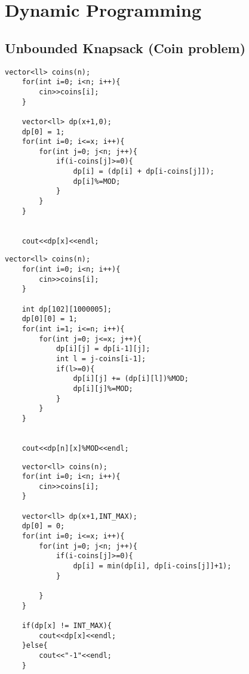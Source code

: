 \documentclass{article}
\begin{document}
\section{Dynamic Programming}
\subsection{Unbounded Knapsack (Coin problem)}
\begin{lstlisting}
vector<ll> coins(n);
    for(int i=0; i<n; i++){
        cin>>coins[i];
    }
    
    vector<ll> dp(x+1,0);
    dp[0] = 1;
    for(int i=0; i<=x; i++){
        for(int j=0; j<n; j++){
            if(i-coins[j]>=0){
                dp[i] = (dp[i] + dp[i-coins[j]]);
                dp[i]%=MOD;
            }
        }
    }
        
        
    cout<<dp[x]<<endl;
\end{lstlisting}
 
\begin{lstlisting}
vector<ll> coins(n);
    for(int i=0; i<n; i++){
        cin>>coins[i];
    }
    
    int dp[102][1000005];
    dp[0][0] = 1;
    for(int i=1; i<=n; i++){
        for(int j=0; j<=x; j++){
            dp[i][j] = dp[i-1][j];
            int l = j-coins[i-1];
            if(l>=0){
                dp[i][j] += (dp[i][l])%MOD;
                dp[i][j]%=MOD;
            }
        }
    }
        
        
    cout<<dp[n][x]%MOD<<endl;
\end{lstlisting}

\begin{lstlisting}
    vector<ll> coins(n);
    for(int i=0; i<n; i++){
        cin>>coins[i];
    }
    
    vector<ll> dp(x+1,INT_MAX);
    dp[0] = 0;
    for(int i=0; i<=x; i++){
        for(int j=0; j<n; j++){
            if(i-coins[j]>=0){
                dp[i] = min(dp[i], dp[i-coins[j]]+1);
            }
            
        }
    }
    
    if(dp[x] != INT_MAX){
        cout<<dp[x]<<endl;
    }else{
        cout<<"-1"<<endl;
    }
\end{lstlisting}
\end{document}
